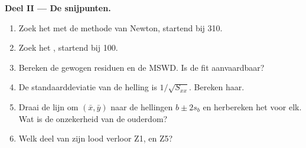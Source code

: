 \begin{problem}
\medskip\noindent\textbf{Deel II --- De snijpunten.}
\begin{enumerate}[resume]
\item Zoek het  met de methode van Newton, startend bij \qty{310}{\Ma}.
\item Zoek het , startend bij \qty{100}{\Ma}.
\item Bereken de gewogen residuen en de MSWD. Is de fit aanvaardbaar?
\item De standaarddeviatie van de helling is $1/\sqrt{S_{xx}}$. Bereken haar.
\item Draai de lijn om $(\bar x, \bar y)$ naar de hellingen $b \pm 2s_b$ en
herbereken het  voor elk. Wat is de onzekerheid van de ouderdom?
\item Welk deel van zijn lood verloor Z1, en Z5?
\end{enumerate}


\end{problem}
